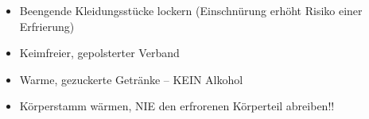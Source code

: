 \label{m:erfrierung}
\begin{itemize}
  \item Beengende Kleidungsstücke lockern (Einschnürung erhöht
  Risiko einer Erfrierung)
  \item Keimfreier, gepolsterter Verband
  \item Warme, gezuckerte Getränke -- KEIN Alkohol
  \item Körperstamm wärmen, NIE den erfrorenen Körperteil abreiben!!
\end{itemize}